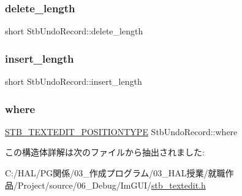 \subsubsection{\texorpdfstring{delete\+\_\+length}{delete\_length}}
{\footnotesize\ttfamily short Stb\+Undo\+Record\+::delete\+\_\+length}

\mbox{\label{struct_stb_undo_record_ae2a3af79db791549db0c42263407cab5}} 
\subsubsection{\texorpdfstring{insert\+\_\+length}{insert\_length}}
{\footnotesize\ttfamily short Stb\+Undo\+Record\+::insert\+\_\+length}

\mbox{\label{struct_stb_undo_record_a49e87adbb75a18ffba1f853ac974b31d}} 
\subsubsection{\texorpdfstring{where}{where}}
{\footnotesize\ttfamily \mbox{\hyperlink{stb__textedit_8h_a5d0c1b8751b6517e3d817f2a025ed654}{S\+T\+B\+\_\+\+T\+E\+X\+T\+E\+D\+I\+T\+\_\+\+P\+O\+S\+I\+T\+I\+O\+N\+T\+Y\+PE}} Stb\+Undo\+Record\+::where}



この構造体詳解は次のファイルから抽出されました\+:\begin{DoxyCompactItemize}
\item 
C\+:/\+H\+A\+L/\+P\+G関係/03\+\_\+作成プログラム/03\+\_\+\+H\+A\+L授業/就職作品/\+Project/source/06\+\_\+\+Debug/\+Im\+G\+U\+I/\mbox{\hyperlink{stb__textedit_8h}{stb\+\_\+textedit.\+h}}\end{DoxyCompactItemize}
